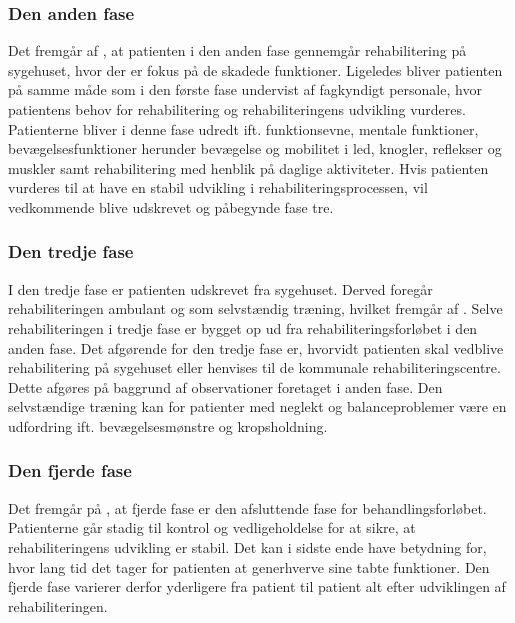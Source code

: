 \subsubsection{Den anden fase}
Det fremgår af , at patienten i den anden fase gennemgår rehabilitering på sygehuset, hvor der er fokus på de skadede funktioner. Ligeledes bliver patienten på samme måde som i den første fase undervist af fagkyndigt personale, hvor patientens behov for rehabilitering og rehabiliteringens udvikling vurderes. Patienterne bliver i denne fase udredt ift. funktionsevne, mentale funktioner, bevægelsesfunktioner herunder bevægelse og mobilitet i led, knogler, reflekser og muskler samt rehabilitering med henblik på daglige aktiviteter. Hvis patienten vurderes til at have en stabil udvikling i rehabiliteringsprocessen, vil vedkommende blive udskrevet og påbegynde fase tre. \cite{Sundhedsstyrelsen2011a}


\subsubsection{Den tredje fase}
I den tredje fase er patienten udskrevet fra sygehuset. Derved foregår rehabiliteringen ambulant og som selvstændig træning, hvilket fremgår af .  Selve rehabiliteringen i tredje fase er bygget op ud fra rehabiliteringsforløbet i den anden fase. Det afgørende for den tredje fase er, hvorvidt patienten skal vedblive rehabilitering på sygehuset eller henvises til de kommunale rehabiliteringscentre. Dette afgøres på baggrund af observationer foretaget i anden fase. Den selvstændige træning kan for patienter med neglekt og balanceproblemer være en udfordring ift. bevægelsesmønstre og kropsholdning. \cite{Sundhedsstyrelsen2011a}

\subsubsection{Den fjerde fase}
Det fremgår på , at fjerde fase er den afsluttende fase for behandlingsforløbet. Patienterne går stadig til kontrol og vedligeholdelse for at sikre, at rehabiliteringens udvikling er stabil. Det kan i sidste ende have betydning for, hvor lang tid det tager for patienten at generhverve sine tabte funktioner. Den fjerde fase varierer derfor yderligere fra patient til patient alt efter udviklingen af rehabiliteringen. \cite{Sundhedsstyrelsen2011a} \\

